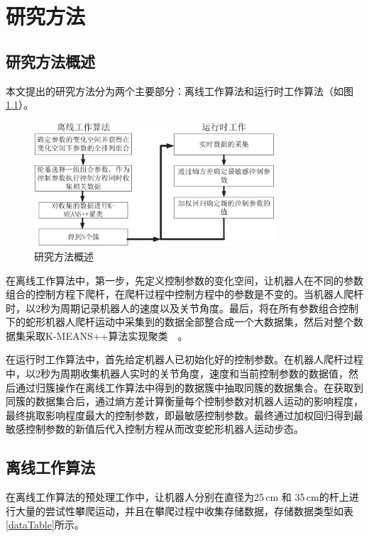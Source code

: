 \chapter{研究方法}
\label{cha:method}

\section{研究方法概述}
本文提出的研究方法分为两个主要部分：离线工作算法和运行时工作算法（如图\ref{fig:stepMap}）。
\begin{figure}[h]
	\centering
	\includegraphics[width=0.8\textwidth]{figure/chap03/step.eps}
	\caption{研究方法概述}
	\label{fig:stepMap}
\end{figure}

在离线工作算法中，第一步，先定义控制参数的变化空间，让机器人在不同的参数组合的控制方程下爬杆，在爬杆过程中控制方程中的参数是不变的。当机器人爬杆时，以2秒为周期记录机器人的速度以及关节角度。最后，将在所有参数组合控制下的蛇形机器人爬杆运动中采集到的数据全部整合成一个大数据集，然后对整个数据集采取K-MEANS++算法实现聚类~\cite{Cluseter_ICT}~\cite{KmeansAndDeepLearning}。

在运行时工作算法中，首先给定机器人已初始化好的控制参数。在机器人爬杆过程中，以2秒为周期收集机器人实时的关节角度，速度和当前控制参数的数据值，然后通过归簇操作在离线工作算法中得到的数据簇中抽取同簇的数据集合。在获取到同簇的数据集合后，通过熵方差计算衡量每个控制参数对机器人运动的影响程度，最终挑取影响程度最大的控制参数，即最敏感控制参数。最终通过加权回归得到最敏感控制参数的新值后代入控制方程从而改变蛇形机器人运动步态。

\section{离线工作算法}
在离线工作算法的预处理工作中，让机器人分别在直径为25\,cm 和 35\,cm的杆上进行大量的尝试性攀爬运动，并且在攀爬过程中收集存储数据，存储数据类型如表\,\ref{dataTable}所示。

